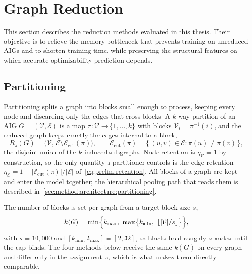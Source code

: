 \section{Graph Reduction}
\label{sec:method:reduction}
This section describes the reduction methods evaluated in this thesis. Their objective is to relieve the memory bottleneck that prevents training on unreduced AIGs and to shorten training time, while preserving the structural features on which accurate optimizability prediction depends.

\subsection{Partitioning}
\label{sec:method:reduction:partitioning}
Partitioning splits a graph into blocks small enough to process, keeping every node and
discarding only the edges that cross blocks. A $k$-way partition of an AIG
$G = (\mathcal{V}, \mathcal{E})$ is a map
$\pi \colon \mathcal{V} \rightarrow \{1, \dots, k\}$ with blocks
$\mathcal{V}_i = \pi^{-1}(i)$, and the reduced graph keeps exactly the edges internal to a
block,
\begin{equation}
    R_\pi(G) = \bigl( \mathcal{V},\
    \mathcal{E} \setminus \mathcal{E}_{\mathrm{cut}}(\pi) \bigr),
    \qquad
    \mathcal{E}_{\mathrm{cut}}(\pi)
    = \{\, (u, v) \in \mathcal{E} : \pi(u) \neq \pi(v) \,\},
    \label{eq:method:partition-graph}
\end{equation}
the disjoint union of the $k$ induced subgraphs. Node retention is
$\eta_{\mathcal{V}} = 1$ by construction, so the only quantity a partitioner controls is
the edge retention
$\eta_{\mathcal{E}} = 1 - |\mathcal{E}_{\mathrm{cut}}(\pi)| / |\mathcal{E}|$
of~\eqref{eq:prelim:retention}. All blocks of a graph are kept and enter the model
together; the hierarchical pooling path that reads them is described
in~\ref{sec:method:architecture:partitioning}.

The number of blocks is set per graph from a target block size $s$,
\begin{equation}
    k(G) = \min\Bigl\{ k_{\max},\
    \max\bigl\{ k_{\min},\ \lfloor |\mathcal{V}| / s \rfloor \bigr\} \Bigr\},
    \label{eq:method:partition-k}
\end{equation}
with $s = 10{,}000$ and $[k_{\min}, k_{\max}] = [2, 32]$, so blocks hold roughly $s$ nodes
until the cap binds. The four methods below receive the same $k(G)$ on every graph and
differ only in the assignment $\pi$, which is what makes them directly comparable.

